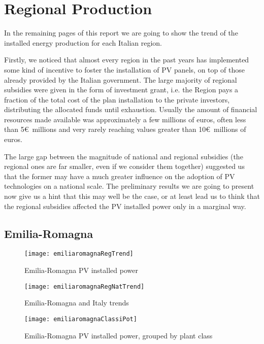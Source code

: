 \documentclass[12pt,a4paper,openright,twoside]{report}
\begin{document}
\section*{Regional Production}

In the remaining pages of this report we are going to show the trend of the installed energy production for each Italian region.

Firstly, we noticed that almost every region in the past years has implemented some kind of incentive to foster the installation of PV panels, on top of those already provided by the Italian government. The large majority of regional subsidies were given in the form of investment grant, i.e. the Region pays a fraction of the total cost of the plan installation to the private investors, distributing the allocated funds until exhaustion. Usually the amount of financial resources made available was approximately a few millions of euros, often less than 5\euro\ millions and very rarely reaching values greater than 10\euro\ millions of euros. 

The large gap between the magnitude of national and regional subsidies (the regional ones are far smaller, even if we consider them together) suggested us that the former may have a much greater influence on the adoption of PV technologies on a national scale. The preliminary results we are going to present now give us a hint that this may well be the case, or at least lead us to think that the regional subsidies affected the PV installed power only in a marginal way.

\clearpage

\subsection*{Emilia-Romagna}

\begin{figure}[hp]
	\centering
	\texttt{[image: emiliaromagnaRegTrend]}
	\caption{Emilia-Romagna PV installed power}
	\label{emiliaromagnaRegTrend}
\end{figure}

\begin{figure}[hp]
	\centering
	\texttt{[image: emiliaromagnaRegNatTrend]}
	\caption{Emilia-Romagna and Italy trends}
	\label{emiliaromagnaRegNatTrend}
\end{figure}

\clearpage

\begin{figure}[hp]
	\centering
	\texttt{[image: emiliaromagnaClassiPot]}
	\caption{Emilia-Romagna PV installed power, grouped by plant class}
	\label{emiliaromagnaClassiPot}
\end{figure}
\end{document}
